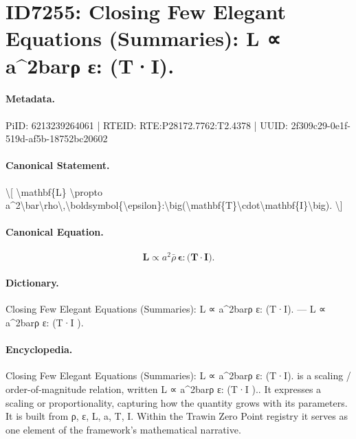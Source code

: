 \section*{ID7255: Closing Few Elegant Equations (Summaries): L ∝ a\textasciicircum{}2barρ ε: (T·I).}
\paragraph{Metadata.}
PiID: 6213239264061 | RTEID: RTE:P28172.7762:T2.4378 | UUID: 2f309c29-0e1f-519d-af5b-18752bc20602

\paragraph{Canonical Statement.}
\textbackslash{}[ \textbackslash{}mathbf\{L\} \textbackslash{}propto a\textasciicircum{}2\textbackslash{}bar\textbackslash{}rho\textbackslash{},\textbackslash{}boldsymbol\{\textbackslash{}epsilon\}:\textbackslash{}big(\textbackslash{}mathbf\{T\}\textbackslash{}cdot\textbackslash{}mathbf\{I\}\textbackslash{}big). \textbackslash{}]

\paragraph{Canonical Equation.}
\[
\mathbf{L} \propto a^2\bar\rho\,\boldsymbol{\epsilon}:\big(\mathbf{T}\cdot\mathbf{I}\big).
\]

\paragraph{Dictionary.}
Closing Few Elegant Equations (Summaries): L ∝ a\textasciicircum{}2barρ ε: (T·I). — L ∝ a\textasciicircum{}2barρ ε: (T·I ).

\paragraph{Encyclopedia.}
Closing Few Elegant Equations (Summaries): L ∝ a\textasciicircum{}2barρ ε: (T·I). is a scaling / order-of-magnitude relation, written L ∝ a\textasciicircum{}2barρ ε: (T·I ).. It expresses a scaling or proportionality, capturing how the quantity grows with its parameters. It is built from ρ, ε, L, a, T, I. Within the Trawin Zero Point registry it serves as one element of the framework's mathematical narrative.
